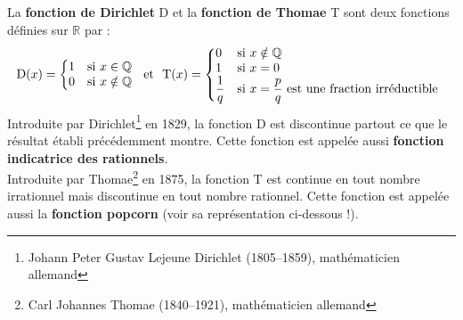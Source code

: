 \begin{enigme}
La \textbf{fonction de Dirichlet} D et la \textbf{fonction de Thomae} T sont deux fonctions définies sur $\mathbb{R}$ par  :
\[\text{D}(x)=\left\{\begin{matrix} 1  &  \text{si~} x\in\mathbb{Q} \\ 0  & \text{si~} x\notin\mathbb{Q} \end{matrix}\right.
\text{~~et~~} \text{T}(x)=\left\{\begin{array}{@{}ll} 0  & \text{si~} x\notin\mathbb{Q} \\ 1 & \text{si~} x=0 \\ \dfrac{1}{q} & \text{si~} x=\dfrac{p}{q} \text{~est une fraction irréductible}\end{array}\right.\]
Introduite par Dirichlet\footnote{Johann Peter Gustav Lejeune Dirichlet (1805–1859), mathématicien allemand}  en 1829, la fonction D est discontinue partout ce que le résultat établi précédemment montre. Cette fonction est appelée aussi \textbf{fonction indicatrice des rationnels}.\\
Introduite par Thomae\footnote{Carl Johannes Thomae (1840–1921), mathématicien allemand} en 1875, la fonction T est continue en tout nombre irrationnel mais  discontinue en tout nombre rationnel. Cette fonction est appelée aussi la \textbf{fonction popcorn} (voir sa représentation ci-dessous !).
\begin{center}

\end{center}




\end{enigme} 